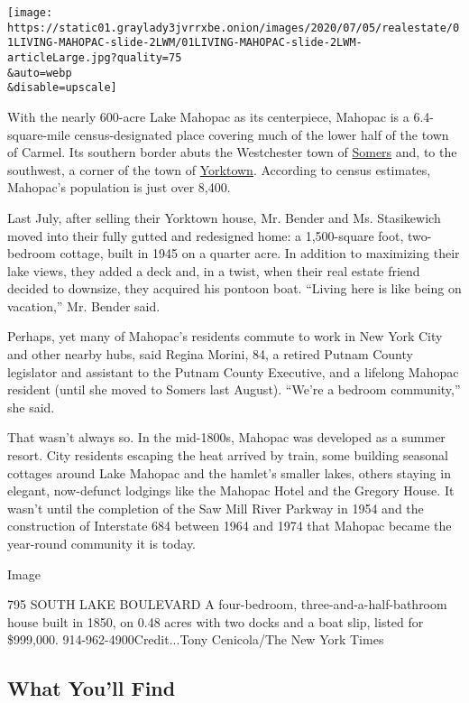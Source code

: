 \texttt{[image: https://static01.graylady3jvrrxbe.onion/images/2020/07/05/realestate/01LIVING-MAHOPAC-slide-2LWM/01LIVING-MAHOPAC-slide-2LWM-articleLarge.jpg?quality=75\\\&auto=webp\\\&disable=upscale]}

With the nearly 600-acre Lake Mahopac as its centerpiece, Mahopac is a
6.4-square-mile census-designated place covering much of the lower half
of the town of Carmel. Its southern border abuts the Westchester town of
\href{https://www.nytimes3xbfgragh.onion/2019/01/02/realestate/somers-ny-a-close-knit-town-with-plenty-of-shopping-and-great-parks.html}{Somers}
and, to the southwest, a corner of the town of
\href{https://www.nytimes3xbfgragh.onion/2001/05/13/realestate/if-you-re-thinking-of-living-in-yorktown-a-town-that-values-a-sense-of-country.html}{Yorktown}.
According to census estimates, Mahopac's population is just over 8,400.

Last July, after selling their Yorktown house, Mr. Bender and Ms.
Stasikewich moved into their fully gutted and redesigned home: a
1,500-square foot, two-bedroom cottage, built in 1945 on a quarter acre.
In addition to maximizing their lake views, they added a deck and, in a
twist, when their real estate friend decided to downsize, they acquired
his pontoon boat. ``Living here is like being on vacation,'' Mr. Bender
said.

Perhaps, yet many of Mahopac's residents commute to work in New York
City and other nearby hubs, said Regina Morini, 84, a retired Putnam
County legislator and assistant to the Putnam County Executive, and a
lifelong Mahopac resident (until she moved to Somers last August).
``We're a bedroom community,'' she said.

That wasn't always so. In the mid-1800s, Mahopac was developed as a
summer resort. City residents escaping the heat arrived by train, some
building seasonal cottages around Lake Mahopac and the hamlet's smaller
lakes, others staying in elegant, now-defunct lodgings like the Mahopac
Hotel and the Gregory House. It wasn't until the completion of the Saw
Mill River Parkway in 1954 and the construction of Interstate 684
between 1964 and 1974 that Mahopac became the year-round community it is
today.

Image

795 SOUTH LAKE BOULEVARD \textbar{} A four-bedroom,
three-and-a-half-bathroom house built in 1850, on 0.48 acres with two
docks and a boat slip, listed for \$999,000. 914-962-4900Credit...Tony
Cenicola/The New York Times

\hypertarget{what-youll-find}{%
\subsection{What You'll Find}\label{what-youll-find}}

